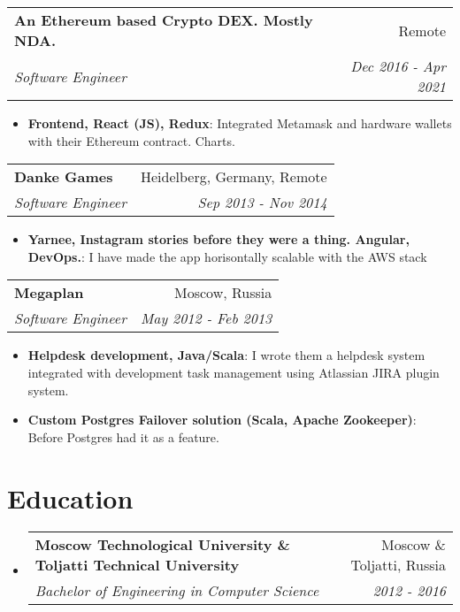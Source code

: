 \documentclass[letterpaper,11pt]{article}
\makeatletter
\newcommand{\resumeItem}[2]{
  \item\small{
    \textbf{#1}{: #2 \vspace{-2pt}}
  }
}
\newcommand{\resumeSubheading}[4]{
  \vspace{-1pt}\item
    \begin{tabular*}{0.97\textwidth}[t]{l@{\extracolsep{\fill}}r}
      \textbf{#1} & #2 \\
      \textit{\small#3} & \textit{\small #4} \\
    \end{tabular*}\vspace{-5pt}
}
\newcommand{\resumeSubSubheading}[2]{
    \begin{tabular*}{0.97\textwidth}{l@{\extracolsep{\fill}}r}
      \textit{\small#1} & \textit{\small #2} \\
    \end{tabular*}\vspace{-5pt}
}
\newcommand{\resumeSubHeadingListStart}{\begin{itemize}[leftmargin=*]}
\newcommand{\resumeSubHeadingListEnd}{\end{itemize}}
\newcommand{\resumeItemListStart}{\begin{itemize}}
\newcommand{\resumeItemListEnd}{\end{itemize}\vspace{-5pt}}
\makeatother
\begin{document}
    \resumeSubheading
      {An Ethereum based Crypto DEX. Mostly NDA.}{Remote}
      {Software Engineer}{Dec 2016 - Apr 2021}
      \resumeItemListStart
        \resumeItem{Frontend, React (JS), Redux}
          {Integrated Metamask and hardware wallets with their Ethereum contract. Charts.}
      \resumeItemListEnd

    \resumeSubheading
      {Danke Games}{Heidelberg, Germany, Remote}
      {Software Engineer}{Sep 2013 - Nov 2014}
      \resumeItemListStart
        \resumeItem{Yarnee, Instagram stories before they were a thing. Angular, DevOps.}
          {I have made the app horisontally scalable with the AWS stack}
      \resumeItemListEnd

    \resumeSubheading
      {Megaplan}{Moscow, Russia}
      {Software Engineer}{May 2012 - Feb 2013}
      \resumeItemListStart
        \resumeItem{Helpdesk development, Java/Scala}
          {I wrote them a helpdesk system integrated with development task management using Atlassian JIRA plugin system.}
        \resumeItem{Custom Postgres Failover solution (Scala, Apache Zookeeper)}
          {Before Postgres had it as a feature.}
      \resumeItemListEnd


\section{Education}
  \resumeSubHeadingListStart
    \resumeSubheading
      {Moscow Technological University \& Toljatti Technical University}{Moscow \& Toljatti, Russia}
      {Bachelor of Engineering in Computer Science}{2012 - 2016}
  \resumeSubHeadingListEnd




      
\end{document}
